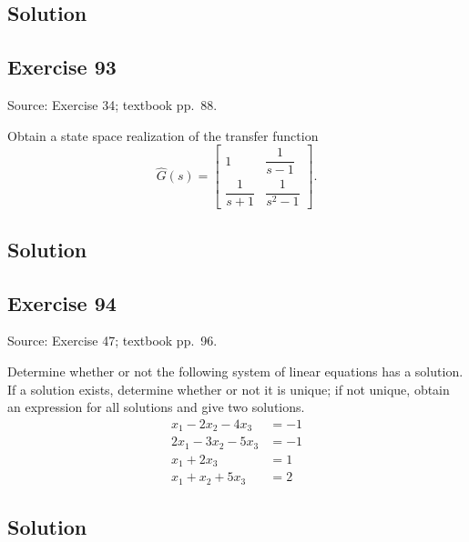 \documentclass[12pt,a4paper]{article}
\newlength{\questionroom}
\newenvironment{questionprompt}{%
  \begin{lrbox}{\questionbox}\begin{minipage}{\linewidth}%
}{%
  \end{minipage}\end{lrbox}%
  \setlength{\questionroom}{\dimexpr\ht\questionbox+\dp\questionbox+5.2cm\relax}%
  \ifdim\questionroom>\textheight\setlength{\questionroom}{\textheight}\fi
  \Needspace{\questionroom}%
  \noindent\usebox{\questionbox}\par
}
\begin{document}
\subsection*{Solution}
\vspace{3.5cm}


\begin{questionprompt}
\section*{Exercise 93}
\label{practice:93}
{\small Source: Exercise 34; textbook pp.~88.}\par
Obtain a state space realization of the transfer function
\[\widehat G(s)=\begin{bmatrix}1&\dfrac{1}{s-1}\\[5pt]\dfrac{1}{s+1}&\dfrac{1}{s^2-1}\end{bmatrix}.\]
\end{questionprompt}
\subsection*{Solution}
\vspace{3.5cm}


\begin{questionprompt}
\section*{Exercise 94}
\label{practice:94}
{\small Source: Exercise 47; textbook pp.~96.}\par
Determine whether or not the following system of linear equations has a solution. If a solution exists, determine whether or not it is unique; if not unique, obtain an expression for all solutions and give two solutions.
\begin{align*}x_1-2x_2-4x_3&=-1\\2x_1-3x_2-5x_3&=-1\\x_1+2x_3&=1\\x_1+x_2+5x_3&=2\end{align*}
\end{questionprompt}
\subsection*{Solution}
\vspace{3.5cm}
\end{document}

